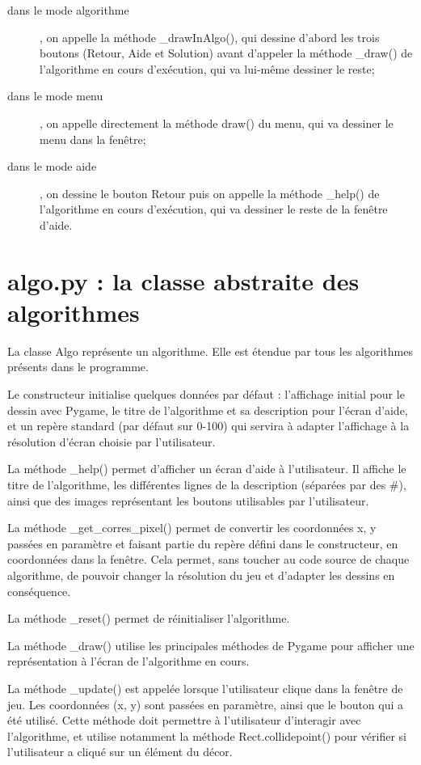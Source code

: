 \documentclass{scrreprt}
\begin{document}
\begin{description}
	\item[dans le mode algorithme], on appelle la méthode \_drawInAlgo(), qui dessine
	 d'abord les trois boutons (Retour, Aide et Solution) avant d'appeler la méthode
	 \_draw() de l'algorithme en cours d'exécution, qui va lui-même dessiner le reste;
	\item[dans le mode menu], on appelle directement la méthode draw() du menu, qui
	 va dessiner le menu dans la fenêtre;
	\item[dans le mode aide], on dessine le bouton Retour puis on appelle la méthode
	 \_help() de l'algorithme en cours d'exécution, qui va dessiner le reste de la fenêtre
	 d'aide.
\end{description}

\section{algo.py : la classe abstraite des algorithmes}

La classe Algo représente un algorithme. Elle est étendue par tous les algorithmes
 présents dans le programme.

Le constructeur initialise quelques données par défaut : l'affichage initial pour le
 dessin avec Pygame, le titre de l'algorithme et sa description pour l'écran d'aide,
 et un repère standard (par défaut sur 0-100) qui servira à adapter l'affichage à la
 résolution d'écran choisie par l'utilisateur.

La méthode \_help() permet d'afficher un écran d'aide à l'utilisateur. Il affiche
 le titre de l'algorithme, les différentes lignes de la description (séparées par
 des \#), ainsi que des images représentant les boutons utilisables par l'utilisateur.

La méthode \_get\_corres\_pixel() permet de convertir les coordonnées x, y passées
 en paramètre et faisant partie du repère défini dans le constructeur, en coordonnées
 dans la fenêtre. Cela permet, sans toucher au code source de chaque algorithme, de
 pouvoir changer la résolution du jeu et d'adapter les dessins en conséquence.

La méthode \_reset() permet de réinitialiser l'algorithme.

La méthode \_draw() utilise les principales méthodes de Pygame pour afficher une
 représentation à l'écran de l'algorithme en cours.

La méthode \_update() est appelée lorsque l'utilisateur clique dans la fenêtre de jeu.
 Les coordonnées (x, y) sont passées en paramètre, ainsi que le bouton qui a été utilisé.
 Cette méthode doit permettre à l'utilisateur d'interagir avec l'algorithme, et utilise
 notamment la méthode Rect.collidepoint() pour vérifier si l'utilisateur a cliqué sur
 un élément du décor.
\end{document}
